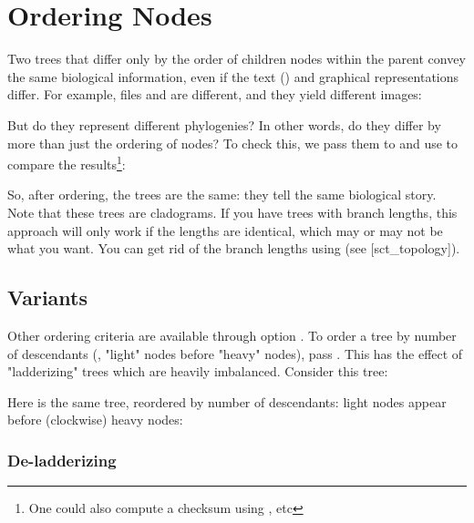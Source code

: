 
\section[sct_order]{Ordering Nodes}


Two trees that differ only by the order of children nodes within the parent
convey the same biological information, even if the text (\nw) and graphical
representations differ.  For example, files  and
 are different, and they yield different images:



But do they represent different phylogenies? In other words, do they
differ by more than just the ordering of nodes? To check this, we pass them to
\order{} and use  to compare the results\footnote{One could also compute a checksum using , etc}:


So, after ordering, the trees are the same: they tell the same biological
story. Note that these trees are cladograms. If you have trees with branch
lengths, this approach will only work if the lengths are identical, which may or
may not be what you want. You can get rid of the branch lengths using
\topology{} (see \in{}[sct_topology]).

\subsection{Variants}

Other ordering criteria are available through option . To order a
tree by number of descendants (\ie, "light" nodes before "heavy"
nodes), pass . This has the effect of "ladderizing" trees which are
heavily imbalanced. Consider this tree:


Here is the same tree, reordered by number of descendants: light
nodes appear before (clockwise) heavy nodes:


\subsubsection{De-ladderizing}

